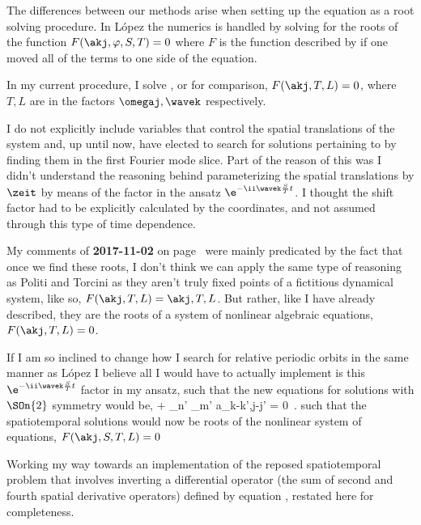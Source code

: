 The differences between our methods arise when setting up the equation as a root
solving procedure. In L{\'o}pez \etal{} the numerics is handled by solving for the
roots of the function $F(\akj ,\varphi , S, T) = 0$ where $F$ is the function described
by  if one moved all of the terms to one side of the equation.

In my current procedure, I solve
, %
or for comparison,
$F(\akj, T, L) = 0$, where $T,L$ are in the factors $\omegaj,\wavek$ respectively.

I do not explicitly include variables that control the spatial translations of the system and,
up until now, have elected to search for {\rpo} solutions pertaining to
by finding them in the first Fourier mode slice. Part of the reason of this was I didn't
understand the reasoning behind parameterizing the spatial translations by $\zeit$ by means
of the factor in the ansatz $\e^{-\ii \wavek \frac{S}{T}t}$. I thought the shift factor
had to be explicitly calculated by the coordinates, and not assumed through this type of time
dependence.

My comments of
{\bf 2017-11-02} on page~\pageref{2017-11-02MNG}
were mainly predicated by the fact that once we find these roots, I don't think
we can apply the same type of reasoning as Politi and Torcini as
they aren't truly fixed points of a fictitious dynamical system, like so,
$F(\akj, T, L) = {\akj, T, L}$. But rather, like I have already
described, they are the roots of a system of nonlinear algebraic equations,
$F(\akj, T, L) = 0$.

If I am so inclined to change how I search for relative periodic orbits in the same manner as
L{\'o}pez \etal{} I believe all I would have to actually implement is this $\e^{-\ii \wavek \frac{S}{T}t}$
factor in my ansatz, such that the new equations for solutions with $\SOn{2}$ symmetry would be,
\beq
{} \akj
+  \!\sum_{n'} \sum_{m'}\!\!
\akj a_{k-k',j-j'}
    = 0
\,.
\label{eqn:FksSpattemp_rel}
\eeq
such that the spatiotemporal solutions would now be roots of the nonlinear system of equations,
$F(\akj, S, T, L) = 0$

Working my way towards an implementation of the reposed spatiotemporal problem that
involves inverting a differential operator (the sum of second and fourth spatial derivative operators)
defined by equation , restated here for completeness.

